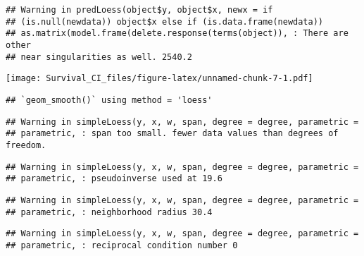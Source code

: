 \documentclass[]{article}
\newenvironment{Shaded}{\begin{snugshade}}{\end{snugshade}}
\newcommand{\KeywordTok}[1]{\textcolor[rgb]{0.13,0.29,0.53}{\textbf{{#1}}}}
\newcommand{\DataTypeTok}[1]{\textcolor[rgb]{0.13,0.29,0.53}{{#1}}}
\newcommand{\StringTok}[1]{\textcolor[rgb]{0.31,0.60,0.02}{{#1}}}
\newcommand{\NormalTok}[1]{{#1}}
\begin{document}
\begin{verbatim}
## Warning in predLoess(object$y, object$x, newx = if
## (is.null(newdata)) object$x else if (is.data.frame(newdata))
## as.matrix(model.frame(delete.response(terms(object)), : There are other
## near singularities as well. 2540.2
\end{verbatim}

\texttt{[image: Survival\_CI\_files/figure-latex/unnamed-chunk-7-1.pdf]}

\begin{Shaded}
\end{Shaded}

\begin{verbatim}
## `geom_smooth()` using method = 'loess'
\end{verbatim}

\begin{verbatim}
## Warning in simpleLoess(y, x, w, span, degree = degree, parametric =
## parametric, : span too small. fewer data values than degrees of freedom.
\end{verbatim}

\begin{verbatim}
## Warning in simpleLoess(y, x, w, span, degree = degree, parametric =
## parametric, : pseudoinverse used at 19.6
\end{verbatim}

\begin{verbatim}
## Warning in simpleLoess(y, x, w, span, degree = degree, parametric =
## parametric, : neighborhood radius 30.4
\end{verbatim}

\begin{verbatim}
## Warning in simpleLoess(y, x, w, span, degree = degree, parametric =
## parametric, : reciprocal condition number 0
\end{verbatim}
\end{document}

